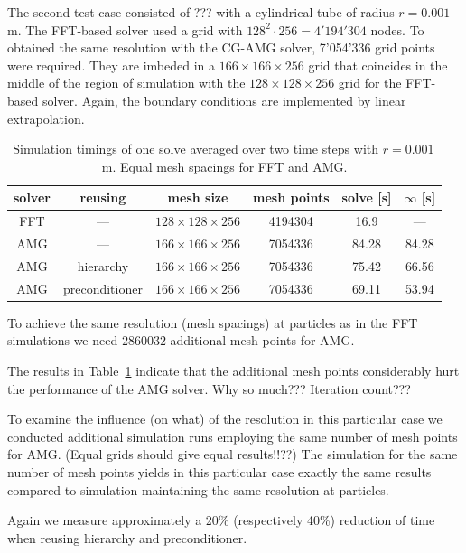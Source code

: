 The second test case consisted of ??? with a cylindrical tube of radius
$r=0.001$\,m.  The FFT-based solver used a grid with
$128^2\cdot256=4'194'304$ nodes.  To obtained the same resolution with
the CG-AMG solver, 7'054'336 grid points were required.  They are
imbeded in a $166\times166\times256$ grid that coincides in the middle
of the region of simulation with the $128\times128\times256$ grid for
the FFT-based solver.  Again, the boundary conditions are implemented by
linear extrapolation.

\begin{table}[ht]
  \begin{center}
    \begin{tabular}{cccccc}
    \hline
        solver & reusing & mesh size & mesh points & solve [s] & $\infty$ [s] \\
        \hline
        FFT & --- & $128\times128\times256$ & 4194304 & 16.9 & --- \\
        AMG & --- & $166\times166\times256$ & 7054336 & 84.28 & 84.28 \\
        AMG & hierarchy & $166\times166\times256$ & 7054336 & 75.42 & 66.56 \\
        AMG & preconditioner & $166\times166\times256$ & 7054336 & 69.11 & 53.94 \\
        \hline
  \end{tabular}
  \caption{Simulation timings of one solve averaged over two time steps
    with $r=0.001$\,m.  Equal mesh spacings for FFT and AMG.}
  \label{tbl:timings_variations_overview_fixmeshspacings} \end{center}
\end{table}


To achieve the same resolution (mesh spacings) at particles as in the
FFT simulations we need $2860032$ additional mesh points for AMG.

The results in
Table~\ref{tbl:timings_variations_overview_fixmeshspacings} indicate
that the additional mesh points considerably hurt the performance of the
AMG solver.  Why so much???  Iteration count???

To examine the influence (on what) of the resolution in this particular
case we conducted additional simulation runs employing the same number
of mesh points for AMG.  (Equal grids should give equal results!!??)
The simulation for the same number of mesh points yields in this
particular case exactly the same results compared to simulation
maintaining the same resolution at particles.

Again we measure approximately a 20\% (respectively 40\%) reduction of
time when reusing hierarchy and preconditioner.

